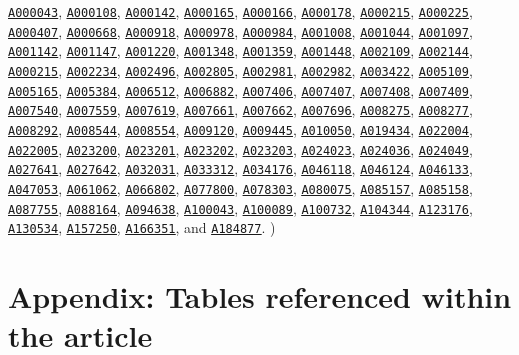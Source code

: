 \documentclass[12pt,reqno]{article}
\numberwithin{sfootnote}{section}
\numberwithin{equation}{section}
\theoremstyle{DefaultTheoremStyle}
\theoremstyle{definition}
\newcommand{\seqnum}[1]{\href{http://oeis.org/#1}{\texttt{\underline{#1}}}}
\begin{document}
\seqnum{A000043}, \seqnum{A000108}, \seqnum{A000142}, \seqnum{A000165}, 
\seqnum{A000166}, \seqnum{A000178}, \seqnum{A000215}, \seqnum{A000225}, 
\seqnum{A000407}, \seqnum{A000668}, \seqnum{A000918}, \seqnum{A000978},
\seqnum{A000984}, \seqnum{A001008}, \seqnum{A001044}, \seqnum{A001097}, 
\seqnum{A001142}, 
\seqnum{A001147}, \seqnum{A001220}, \seqnum{A001348}, \seqnum{A001359}, 
\seqnum{A001448}, \seqnum{A002109}, \seqnum{A002144}, \seqnum{A000215}, 
\seqnum{A002234}, \seqnum{A002496}, \seqnum{A002805}, \seqnum{A002981}, 
\seqnum{A002982}, \seqnum{A003422}, \seqnum{A005109}, \seqnum{A005165}, 
\seqnum{A005384}, \seqnum{A006512}, \seqnum{A006882}, \seqnum{A007406}, 
\seqnum{A007407}, \seqnum{A007408}, \seqnum{A007409}, \seqnum{A007540}, 
\seqnum{A007559}, \seqnum{A007619}, \seqnum{A007661}, \seqnum{A007662}, 
\seqnum{A007696}, \seqnum{A008275}, \seqnum{A008277}, \seqnum{A008292}, 
\seqnum{A008544}, \seqnum{A008554}, \seqnum{A009120}, \seqnum{A009445}, 
\seqnum{A010050}, \seqnum{A019434}, \seqnum{A022004}, \seqnum{A022005}, 
\seqnum{A023200}, \seqnum{A023201}, \seqnum{A023202}, \seqnum{A023203}, 
\seqnum{A024023}, \seqnum{A024036}, \seqnum{A024049}, \seqnum{A027641}, 
\seqnum{A027642}, \seqnum{A032031}, \seqnum{A033312}, \seqnum{A034176}, 
\seqnum{A046118}, \seqnum{A046124}, \seqnum{A046133}, \seqnum{A047053}, 
\seqnum{A061062}, \seqnum{A066802}, \seqnum{A077800}, \seqnum{A078303}, 
\seqnum{A080075}, \seqnum{A085157}, \seqnum{A085158}, \seqnum{A087755}, 
\seqnum{A088164}, \seqnum{A094638}, \seqnum{A100043}, \seqnum{A100089}, 
\seqnum{A100732}, \seqnum{A104344}, \seqnum{A123176}, \seqnum{A130534}, 
\seqnum{A157250}, \seqnum{A166351}, and \seqnum{A184877}.
) 

\newpage 

\setcounter{section}{0} 
\renewcommand{\thesection}{\Alph{section}} 
\section{Appendix: Tables referenced within the article} 
\label{Section_appendix_StartOfTableData} 
\label{page_StartOfTableData} 
\end{document}
